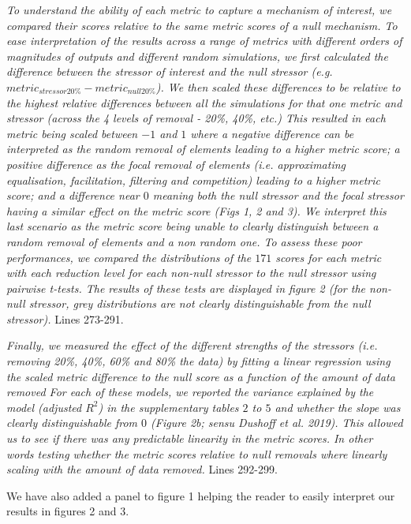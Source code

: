 \documentclass[
]{article}
\begin{document}
\textit{To understand the ability of each metric to capture a mechanism of interest, we compared their scores relative to the same metric scores of a null mechanism.
To ease interpretation of the results across a range of metrics with different orders of magnitudes of outputs and different random simulations, we first calculated the difference between the stressor of interest and the null stressor (e.g. $metric_{stressor20\%} - metric_{null20\%}$).
We then scaled these differences to be relative to the highest relative differences between all the simulations for that one metric and stressor (across the 4 levels of removal - 20\%, 40\%, etc.)
This resulted in each metric being scaled between $-1$ and $1$ where a negative difference can be interpreted as the random removal of elements leading to a higher metric score; a positive difference as the focal removal of elements (i.e. approximating equalisation, facilitation, filtering and competition) leading to a higher metric score; and a difference near $0$ meaning both the null stressor and the focal stressor having a similar effect on the metric score (Figs 1, 2 and 3).
We interpret this last scenario as the metric score being unable to clearly distinguish between a random removal of elements and a non random one.
To assess these poor performances, we compared the distributions of the $171$ scores for each metric with each reduction level for each non-null stressor to the null stressor using pairwise t-tests.
The results of these tests are displayed in figure 2 (for the non-null stressor, grey distributions are not clearly distinguishable from the null stressor).}
Lines 273-291.

\textit{Finally, we measured the effect of the different strengths of the stressors (i.e. removing 20\%, 40\%, 60\% and 80\% the data) by fitting a linear regression using the scaled metric difference to the null score as a function of the amount of data removed
For each of these models, we reported the variance explained by the model (adjusted $R^2$) in the supplementary tables $2$ to $5$ and whether the slope was clearly distinguishable from $0$ (Figure 2b; \textit{sensu} Dushoff et al. 2019).
This allowed us to see if there was any predictable linearity in the metric scores.
In other words testing whether the metric scores relative to null removals where linearly scaling with the amount of data removed.}
Lines 292-299.

We have also added a panel to figure 1 helping the reader to easily interpret our results in figures 2 and 3.
\end{document}
